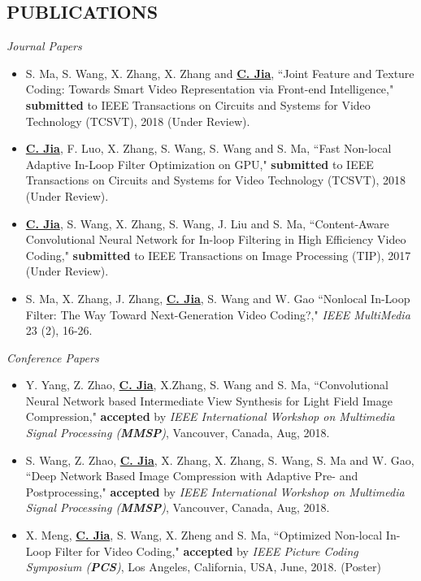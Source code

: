 \documentclass[margin, 10pt]{res} %
\begin{document}
\begin{resume}

\section{PUBLICATIONS}
{\sl Journal Papers}
\begin{itemize}
\item{S. Ma, S. Wang, X. Zhang, X. Zhang and \underline{\bf C. Jia}, ``Joint Feature and Texture Coding: Towards Smart Video Representation via Front-end Intelligence," {\bf submitted} to IEEE Transactions on Circuits and Systems for Video Technology (TCSVT), 2018 (Under Review).}
\item{\underline{\bf C. Jia}, F. Luo, X. Zhang, S. Wang, S. Wang and S. Ma, ``Fast Non-local Adaptive In-Loop Filter Optimization on GPU," {\bf submitted} to IEEE Transactions on Circuits and Systems for Video Technology (TCSVT), 2018 (Under Review).}
\item{\underline{\bf C. Jia}, S. Wang, X. Zhang, S. Wang, J. Liu and S. Ma, ``Content-Aware Convolutional Neural Network for In-loop Filtering in High Efficiency Video Coding," {\bf submitted} to IEEE Transactions on Image Processing (TIP), 2017 (Under Review).}
\item{S. Ma, X. Zhang, J. Zhang, \underline{\bf C. Jia}, S. Wang and W. Gao ``Nonlocal In-Loop Filter: The Way Toward Next-Generation Video Coding?," {\em {IEEE} MultiMedia} 23 (2), 16-26.}
\end{itemize}

{\sl Conference Papers}
\begin{itemize}
\item{Y. Yang, Z. Zhao, \underline{\bf C. Jia}, X.Zhang, S. Wang and S. Ma, ``Convolutional Neural Network based Intermediate View Synthesis for Light Field Image Compression," {\bf accepted} by {\em IEEE International Workshop on Multimedia Signal Processing ({\bf MMSP})}, Vancouver, Canada, Aug, 2018. }

\item{S. Wang, Z. Zhao, \underline{\bf C. Jia}, X. Zhang, X. Zhang, S. Wang, S. Ma and W. Gao, ``Deep Network Based Image Compression with Adaptive Pre- and Postprocessing," {\bf accepted} by {\em IEEE International Workshop on Multimedia Signal Processing ({\bf MMSP})}, Vancouver, Canada, Aug, 2018. }

\item{X. Meng, \underline{\bf C. Jia}, S. Wang, X. Zheng and S. Ma, ``Optimized Non-local In-Loop Filter for Video Coding," {\bf accepted} by {\em IEEE Picture Coding Symposium ({\bf PCS})}, Los Angeles, California, USA, June, 2018. (Poster)}


\end{itemize}
\end{resume}
\end{document}
